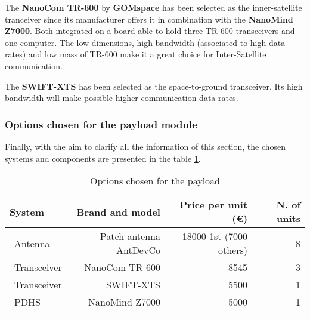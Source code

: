 The \textbf{NanoCom TR-600} by \textbf{GOMspace} has been selected as the inner-satellite tranceiver since its manufacturer offers it in combination with the \textbf{NanoMind Z7000}. Both integrated on a board able to hold three TR-600 transceivers and one computer. The low dimensions, high bandwidth (associated to high data rates) and low mass of TR-600 make it a great choice for Inter-Satellite communication. \cite[Chapter 1, Section 5]{annex4}

The \textbf{SWIFT-XTS} has been selected as the space-to-ground transceiver. Its high bandwidth will make possible higher communication data rates. \cite[Chapter 1, Section 5]{annex4}

\subsubsection{Options chosen for the payload module}

Finally, with the aim to clarify all the information of this section, the chosen systems and components are presented in the table \ref{payloadchosen}.

\begin{longtable}{| l | r | r | r |}
	\hline
	\rowcolor[gray]{0.80}	\textbf{System} &  \textbf{Brand and model}     & \textbf{Price per unit (\euro)} & \textbf{N. of units}  \\
	\hline
	\endfirsthead
	
	~Antenna & Patch antenna AntDevCo & 18000 1st (7000 others) & 8 \\
	~Transceiver & NanoCom TR-600 & 8545 & 3 \\
	~Transceiver & SWIFT-XTS & 5500 &1\\
	~PDHS & NanoMind Z7000 & 5000 & 1 \\
	\hline
	
\caption{Options chosen for the payload}
\label{payloadchosen}
\end{longtable}